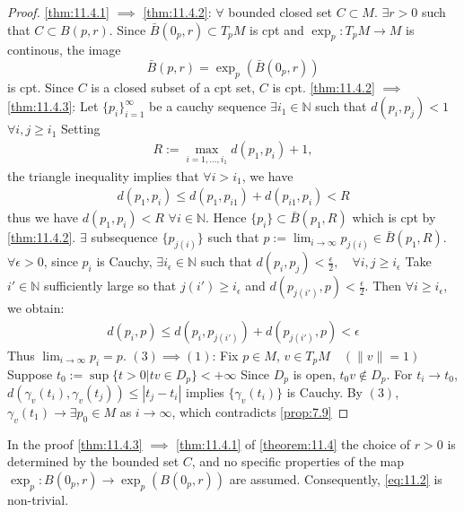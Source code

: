 \begin{proof}
    \autoref{thm:11.4.1} $\implies$ \autoref{thm:11.4.2}: $\forall$ bounded closed set $C \subset M$.
    $\exists r>0$ such that $C \subset B(p,r)$. Since $\bar{B}(0_p,r)\subset T_pM$ is cpt and $\exp_p: T_p M \to M$ is continous, the image
    \begin{equation}\label{eq:11.2}
    \bar{B}(p,r) = \exp_p (\bar{B}(0_p,r))
    \end{equation}
    is cpt.
    Since $C$ is a closed subset of a cpt set, $C$ is cpt.
    \autoref{thm:11.4.2} $\implies$ \autoref{thm:11.4.3}: Let $\{p_i\}^{\infty}_{i=1}$ be a cauchy sequence $\exists i_1 \in \mathbb{N}$ such that $d(p_i, p_j) < 1$ $\forall i,j \geq i_1$ Setting
    \[
    \begin{aligned}
        R := \max_{i=1, \dots, i_1} d(p_1,p_i) +1,
    \end{aligned}
    \]
    the triangle inequality implies that $\forall i > i_1$, we have 
    \[
    \begin{aligned}
        d(p_1, p_i) \leq d(p_1, p_{i1}) + d(p_{i1},p_i) < R
    \end{aligned}
    \]
    thus we have $d(p_1,p_i) < R$ $\forall i \in \mathbb{N}.$
    Hence $\{p_i\} \subset \bar{B}(p_1,R)$ which is cpt by \autoref{thm:11.4.2}.
    $\exists$ subsequence $\{p_{j(i)}\}$ such that $p:= \lim_{i \to \infty} p_{j(i)} \in \bar{B}(p_1,R)$.
    $\forall \epsilon >0$, since ${p_i}$ is Cauchy, $\exists i_{\epsilon} \in \mathbb{N}$ such that $d(p_i, p_j) < \frac{\epsilon}{2}, \quad \forall i,j \geq i_{\epsilon}$
    Take $i' \in \mathbb{N}$ sufficiently large so that $j(i') \geq i_{\epsilon}$ and $d(p_{j(i')},p) < \frac{\epsilon}{2}.$
    Then $\forall i \geq i_{\epsilon}$, we obtain:
    \[
    \begin{aligned}
        d(p_i,p) \leq d(p_i, p_{j(i')}) + d(p_{j(i')},p) < \epsilon
    \end{aligned}
    \]
    Thus $\lim_{i \to \infty} p_i = p$.
    $(3) \implies (1)$: Fix $p \in M$, $v \in T_p M \quad (\|v\| = 1)$
    Suppose $t_0 := \sup \{t>0 | tv \in D_p\} < + \infty$
    Since $D_p$ is open, $t_0v \notin D_p$.
    For $t_i \to t_0$, $d(\gamma_v (t_i), \gamma_v(t_j)) \leq |t_j - t_i |$
    implies $\{\gamma_v (t_i)\}$ is Cauchy. By $(3)$, $\gamma_v (t_1) \to \exists p_0 \in M$
    as $i \to \infty$, which contradicts \autoref{prop:7.9}
\end{proof}

In the proof \autoref{thm:11.4.3} $\implies$ \autoref{thm:11.4.1} of \autoref{theorem:11.4} the choice of $r>0$ is determined by the bounded set $C$, and no specific
properties of the map $\exp_p : B(0_p,r) \to \exp_p (B(0_p,r))$ are assumed. Consequently, \eqref{eq:11.2} is non-trivial.

